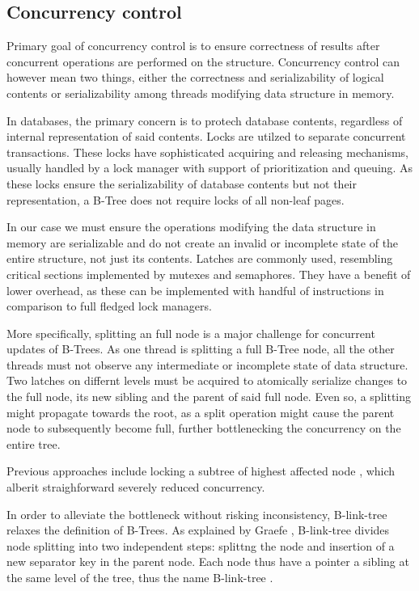 \documentclass{article}
\begin{document}
\subsection{Concurrency control}

Primary goal of concurrency control is to ensure correctness of results after concurrent operations are performed on the structure. Concurrency control can however mean two things, either the correctness and serializability of logical contents or serializability among threads modifying data structure in memory.

In databases, the primary concern is to protech database contents, regardless of internal representation of said contents. Locks are utilzed to separate concurrent transactions. These locks have sophisticated acquiring and releasing mechanisms, usually handled by a lock manager with support of prioritization and queuing. As these locks ensure the serializability of database contents but not their representation, a B-Tree does not require locks of all non-leaf pages.

In our case we must ensure the operations modifying the data structure in memory are serializable and do not create an invalid or incomplete state of the entire structure, not just its contents. Latches are commonly used, resembling critical sections implemented by mutexes and semaphores. They have a benefit of lower overhead, as these can be implemented with handful of instructions in comparison to full fledged lock managers.

More specifically, splitting an full node is a major challenge for concurrent updates of B-Trees. As one thread is splitting a full B-Tree node, all the other threads must not observe any intermediate or incomplete state of data structure. Two latches on differnt levels must be acquired to atomically serialize changes to the full node, its new sibling and the parent of said full node. Even so, a splitting might propagate towards the root, as a split operation might cause the parent node to subsequently become full, further bottlenecking the concurrency on the entire tree.

Previous approaches include locking a subtree of highest affected node \cite{samadi1976b}, which alberit straighforward severely reduced concurrency.

In order to alleviate the bottleneck without risking inconsistency, B-link-tree relaxes the definition of B-Trees. As explained by Graefe \cite{goetz-tech}, B-link-tree divides node splitting into two independent steps: splittng the node and insertion of a new separator key in the parent node. Each node thus have a pointer a sibling at the same level of the tree, thus the name B-link-tree \cite{lehman}.
\end{document}
